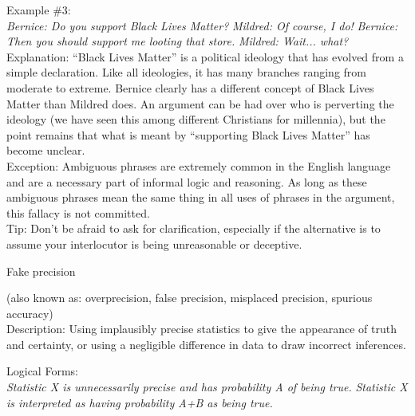 \documentclass[a4paper,12pt,single,pdftex]{scrbook}
\begin{document}
{    
      Example \#3:
    \\

    
      {\em Bernice: Do you support Black Lives Matter?} \newline
{\em Mildred: Of course, I do!} \newline
{\em Bernice: Then you should support me looting that store.} \newline
{\em Mildred: Wait... what?}
    \\

    
      Explanation: “Black Lives Matter” is a political ideology that has evolved from a simple declaration. Like all ideologies, it has many branches ranging from moderate to extreme. Bernice clearly has a different concept of Black Lives Matter than Mildred does. An argument can be had over who is perverting the ideology (we have seen this among different Christians for millennia), but the point remains that what is meant by “supporting Black Lives Matter” has become unclear.
    \\

    
      Exception: Ambiguous phrases are extremely common in the English language and are a necessary part of informal logic and reasoning.  As long as these ambiguous phrases mean the same thing in all uses of phrases in the argument, this fallacy is not committed.
    \\

    
      Tip: Don’t be afraid to ask for clarification, especially if the alternative is to assume your interlocutor is being unreasonable or deceptive.
    \\

  }


Fake precision
    
      (also known as: overprecision, false precision, misplaced precision, spurious accuracy)
    \\

  
    Description: Using implausibly precise statistics to give the appearance of truth and certainty, or using a negligible difference in data to draw incorrect inferences.

    
      Logical Forms:
    \\

    
      {\em Statistic X is unnecessarily precise and has probability A of being true.} \newline
{\em Statistic X is interpreted as having probability A+B as being true.}
    \\
\end{document}

